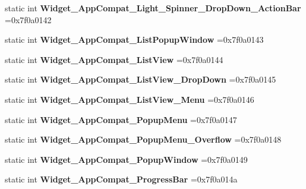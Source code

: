 \begin{DoxyCompactItemize}
static int {\bfseries Widget\+\_\+\+App\+Compat\+\_\+\+Light\+\_\+\+Spinner\+\_\+\+Drop\+Down\+\_\+\+Action\+Bar} =0x7f0a0142
\item 
\mbox{\label{classandroid_1_1support_1_1v4_1_1R_1_1style_aa24d848c2c15c05006166badcd33b7ad}} 
static int {\bfseries Widget\+\_\+\+App\+Compat\+\_\+\+List\+Popup\+Window} =0x7f0a0143
\item 
\mbox{\label{classandroid_1_1support_1_1v4_1_1R_1_1style_afbfa18ed10035f540f553fcd357efaff}} 
static int {\bfseries Widget\+\_\+\+App\+Compat\+\_\+\+List\+View} =0x7f0a0144
\item 
\mbox{\label{classandroid_1_1support_1_1v4_1_1R_1_1style_a51a2170d54961a96ce300d3194a7f6d4}} 
static int {\bfseries Widget\+\_\+\+App\+Compat\+\_\+\+List\+View\+\_\+\+Drop\+Down} =0x7f0a0145
\item 
\mbox{\label{classandroid_1_1support_1_1v4_1_1R_1_1style_a3469e21b33b5af7db5727707a66d9bbe}} 
static int {\bfseries Widget\+\_\+\+App\+Compat\+\_\+\+List\+View\+\_\+\+Menu} =0x7f0a0146
\item 
\mbox{\label{classandroid_1_1support_1_1v4_1_1R_1_1style_a94b69c2a56d750026018b62c501a3700}} 
static int {\bfseries Widget\+\_\+\+App\+Compat\+\_\+\+Popup\+Menu} =0x7f0a0147
\item 
\mbox{\label{classandroid_1_1support_1_1v4_1_1R_1_1style_af5766dd3754c328e0bdcffc3e24689cf}} 
static int {\bfseries Widget\+\_\+\+App\+Compat\+\_\+\+Popup\+Menu\+\_\+\+Overflow} =0x7f0a0148
\item 
\mbox{\label{classandroid_1_1support_1_1v4_1_1R_1_1style_a2279f290a6929965ad32836281b7f407}} 
static int {\bfseries Widget\+\_\+\+App\+Compat\+\_\+\+Popup\+Window} =0x7f0a0149
\item 
\mbox{\label{classandroid_1_1support_1_1v4_1_1R_1_1style_a53c9e7892b022fe7eca7794c28296c36}} 
static int {\bfseries Widget\+\_\+\+App\+Compat\+\_\+\+Progress\+Bar} =0x7f0a014a

\end{DoxyCompactItemize}

